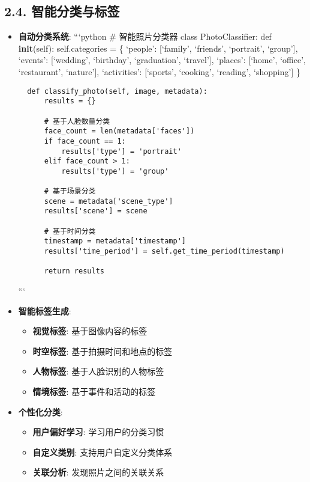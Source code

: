 \subsection{2.4.
智能分类与标签}\label{ux667aux80fdux5206ux7c7bux4e0eux6807ux7b7e}

\begin{itemize}
\item
  \textbf{自动分类系统}: ```python \# 智能照片分类器 class
  PhotoClassifier: def \textbf{init}(self): self.categories = \{
  `people': {[}`family', `friends', `portrait', `group'{]}, `events':
  {[}`wedding', `birthday', `graduation', `travel'{]}, `places':
  {[}`home', `office', `restaurant', `nature'{]}, `activities':
  {[}`sports', `cooking', `reading', `shopping'{]} \}

\begin{lstlisting}
  def classify_photo(self, image, metadata):
      results = {}

      # 基于人脸数量分类
      face_count = len(metadata['faces'])
      if face_count == 1:
          results['type'] = 'portrait'
      elif face_count > 1:
          results['type'] = 'group'

      # 基于场景分类
      scene = metadata['scene_type']
      results['scene'] = scene

      # 基于时间分类
      timestamp = metadata['timestamp']
      results['time_period'] = self.get_time_period(timestamp)

      return results
\end{lstlisting}

  ```
\item
  \textbf{智能标签生成}:

  \begin{itemize}
  \tightlist
  \item
    \textbf{视觉标签}: 基于图像内容的标签
  \item
    \textbf{时空标签}: 基于拍摄时间和地点的标签
  \item
    \textbf{人物标签}: 基于人脸识别的人物标签
  \item
    \textbf{情境标签}: 基于事件和活动的标签
  \end{itemize}
\item
  \textbf{个性化分类}:

  \begin{itemize}
  \tightlist
  \item
    \textbf{用户偏好学习}: 学习用户的分类习惯
  \item
    \textbf{自定义类别}: 支持用户自定义分类体系
  \item
    \textbf{关联分析}: 发现照片之间的关联关系
  \end{itemize}
\end{itemize}

